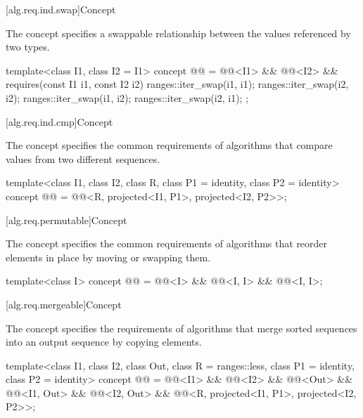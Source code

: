 [alg.req.ind.swap]{Concept }

\pnum
The  concept specifies a swappable relationship
between the values referenced by two  types.

\begin{codeblock}
template<class I1, class I2 = I1>
  concept @@ =
    @@<I1> && @@<I2> &&
    requires(const I1 i1, const I2 i2) {
      ranges::iter_swap(i1, i1);
      ranges::iter_swap(i2, i2);
      ranges::iter_swap(i1, i2);
      ranges::iter_swap(i2, i1);
    };
\end{codeblock}

[alg.req.ind.cmp]{Concept }

\pnum
The  concept specifies
the common requirements of algorithms that
compare values from two different sequences.

\begin{codeblock}
template<class I1, class I2, class R, class P1 = identity,
         class P2 = identity>
  concept @@ =
    @@<R, projected<I1, P1>, projected<I2, P2>>;
\end{codeblock}

[alg.req.permutable]{Concept }

\pnum
The  concept specifies the common requirements
of algorithms that reorder elements in place by moving or swapping them.

\begin{codeblock}
template<class I>
  concept @@ =
    @@<I> &&
    @@<I, I> &&
    @@<I, I>;
\end{codeblock}

[alg.req.mergeable]{Concept }

\pnum
The  concept specifies the requirements of algorithms
that merge sorted sequences into an output sequence by copying elements.

\begin{codeblock}
template<class I1, class I2, class Out, class R = ranges::less,
         class P1 = identity, class P2 = identity>
  concept @@ =
    @@<I1> &&
    @@<I2> &&
    @@<Out> &&
    @@<I1, Out> &&
    @@<I2, Out> &&
    @@<R, projected<I1, P1>, projected<I2, P2>>;
\end{codeblock}

